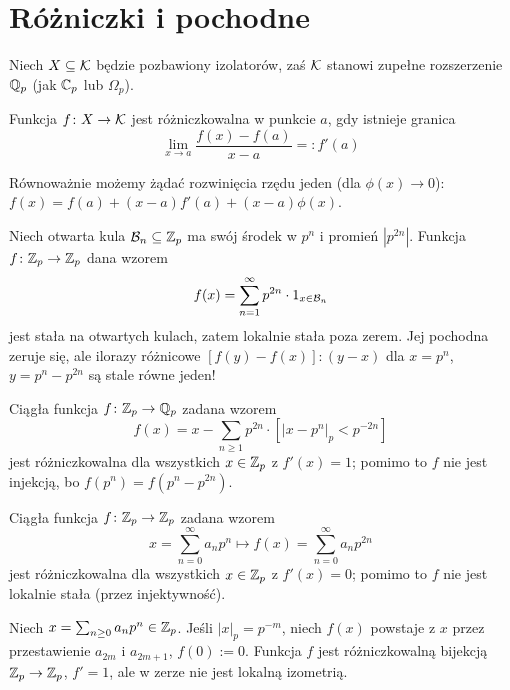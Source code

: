 \section{Różniczki i pochodne}

Niech $X \subseteq \mathcal K$ będzie pozbawiony izolatorów, zaś $\mathcal K$ stanowi zupełne rozszerzenie $\mathbb Q_p$ (jak $\mathbb C_p$ lub $\Omega_p$).

\begin{definicja}
	Funkcja $f \colon X \to \mathcal K$ jest różniczkowalna w punkcie $a$, gdy istnieje granica
	\[
		\lim_{x \to a} \frac{f(x) - f(a)}{x-a} =: f'(a)
	\]
\end{definicja}

Równoważnie możemy żądać rozwinięcia rzędu jeden (dla $\phi(x) \to 0$): $f(x) = f(a) + (x-a) f'(a) + (x-a) \phi(x)$.

\begin{przyklad}
	Niech otwarta kula $\mathcal B_n \subseteq \mathbb Z_p$ ma swój środek w $p^n$ i promień $|p^{2n}|$.
	Funkcja $f \colon \mathbb Z_p \to \mathbb Z_p$ dana wzorem
	\[
		f(x) = \sum_{n=1}^\infty p^{2n} \cdot 1_{x \in \mathcal B_n}
	\]
	jest stała na otwartych kulach, zatem lokalnie stała poza zerem.
	Jej pochodna zeruje się, ale ilorazy różnicowe $[f(y) - f(x)]:(y - x)$ dla $x = p^n$, $y = p^n - p^{2n}$ są stale równe jeden!
\end{przyklad}

\begin{przyklad}
	Ciągła funkcja $f \colon \mathbb Z_p \to \mathbb Q_p$ zadana wzorem
	\[
		f(x) = x - \sum_{n \ge 1} p^{2n} \cdot [|x - p^n|_p < p^{-2n}]
	\]
	jest różniczkowalna dla wszystkich $x \in \mathbb Z_p$ z $f'(x) = 1$; pomimo to $f$ nie jest injekcją, bo $f (p^n) = f(p^n - p^{2n})$.
\end{przyklad}

\begin{przyklad}
	Ciągła funkcja $f \colon \mathbb Z_p \to \mathbb Z_p$ zadana wzorem
	\[
		x = \sum_{n=0}^\infty a_n p^n \mapsto f(x) = \sum_{n=0}^\infty a_n p^{2n}
	\]
	jest różniczkowalna dla wszystkich $x \in \mathbb Z_p$ z $f'(x) = 0$; pomimo to $f$ nie jest lokalnie stała (przez injektywność).
\end{przyklad}

\begin{przyklad}
	Niech $x = \sum_{n \ge 0} a_n p^n \in \mathbb Z_p$.
	Jeśli $|x|_p = p^{-m}$, niech $f(x)$ powstaje z $x$ przez przestawienie $a_{2m}$ i $a_{2m+1}$, $f(0) := 0$.
	Funkcja $f$ jest różniczkowalną bijekcją $\mathbb Z_p \to\mathbb Z_p$, $f' = 1$, ale w zerze nie jest lokalną izometrią.
\end{przyklad}

